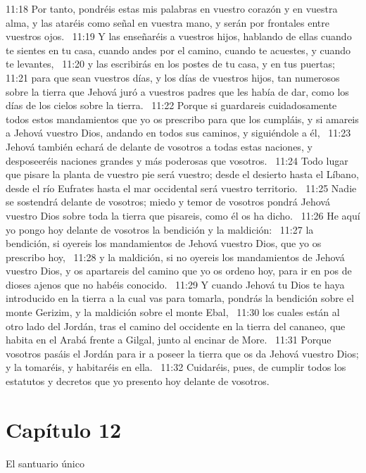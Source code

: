 11:18 Por tanto, pondréis estas mis palabras en vuestro corazón y en vuestra alma, y las ataréis como señal en vuestra mano, y serán por frontales entre vuestros ojos.  
11:19 Y las enseñaréis a vuestros hijos, hablando de ellas cuando te sientes en tu casa, cuando andes por el camino, cuando te acuestes, y cuando te levantes,  
11:20 y las escribirás en los postes de tu casa, y en tus puertas;  
11:21 para que sean vuestros días, y los días de vuestros hijos, tan numerosos sobre la tierra que Jehová juró a vuestros padres que les había de dar, como los días de los cielos sobre la tierra.  
11:22 Porque si guardareis cuidadosamente todos estos mandamientos que yo os prescribo para que los cumpláis, y si amareis a Jehová vuestro Dios, andando en todos sus caminos, y siguiéndole a él,  
11:23 Jehová también echará de delante de vosotros a todas estas naciones, y desposeeréis naciones grandes y más poderosas que vosotros.  
11:24 Todo lugar que pisare la planta de vuestro pie será vuestro; desde el desierto hasta el Líbano, desde el río Eufrates hasta el mar occidental será vuestro territorio.  
11:25 Nadie se sostendrá delante de vosotros; miedo y temor de vosotros pondrá Jehová vuestro Dios sobre toda la tierra que pisareis, como él os ha dicho.  
11:26 He aquí yo pongo hoy delante de vosotros la bendición y la maldición:  
11:27 la bendición, si oyereis los mandamientos de Jehová vuestro Dios, que yo os prescribo hoy,  
11:28 y la maldición, si no oyereis los mandamientos de Jehová vuestro Dios, y os apartareis del camino que yo os ordeno hoy, para ir en pos de dioses ajenos que no habéis conocido.  
11:29 Y cuando Jehová tu Dios te haya introducido en la tierra a la cual vas para tomarla, pondrás la bendición sobre el monte Gerizim, y la maldición sobre el monte Ebal,  
11:30 los cuales están al otro lado del Jordán, tras el camino del occidente en la tierra del cananeo, que habita en el Arabá frente a Gilgal, junto al encinar de More.  
11:31 Porque vosotros pasáis el Jordán para ir a poseer la tierra que os da Jehová vuestro Dios; y la tomaréis, y habitaréis en ella.  
11:32 Cuidaréis, pues, de cumplir todos los estatutos y decretos que yo presento hoy delante de vosotros.  
\section*{Capítulo 12}
El santuario único  

